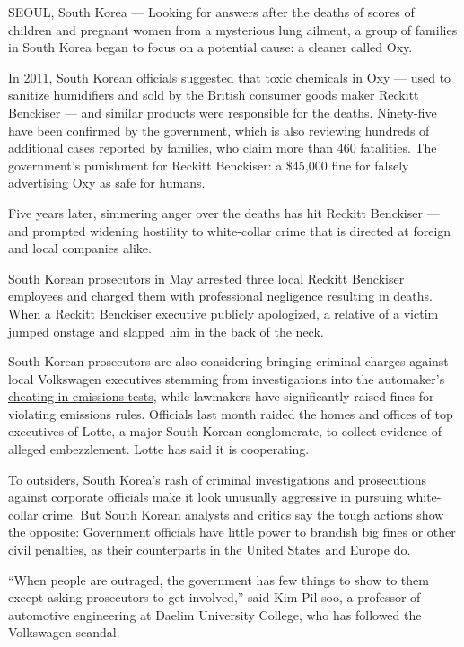 SEOUL, South Korea --- Looking for answers after the deaths of scores of
children and pregnant women from a mysterious lung ailment, a group of
families in South Korea began to focus on a potential cause: a cleaner
called Oxy.

In 2011, South Korean officials suggested that toxic chemicals in Oxy
--- used to sanitize humidifiers and sold by the British consumer goods
maker Reckitt Benckiser --- and similar products were responsible for
the deaths. Ninety-five have been confirmed by the government, which is
also reviewing hundreds of additional cases reported by families, who
claim more than 460 fatalities. The government's punishment for Reckitt
Benckiser: a \$45,000 fine for falsely advertising Oxy as safe for
humans.

Five years later, simmering anger over the deaths has hit Reckitt
Benckiser --- and prompted widening hostility to white-collar crime that
is directed at foreign and local companies alike.

South Korean prosecutors in May arrested three local Reckitt Benckiser
employees and charged them with professional negligence resulting in
deaths. When a Reckitt Benckiser executive publicly apologized, a
relative of a victim jumped onstage and slapped him in the back of the
neck.

South Korean prosecutors are also considering bringing criminal charges
against local Volkswagen executives stemming from investigations into
the automaker's
\href{https://www.nytimes3xbfgragh.onion/interactive/2015/business/international/vw-diesel-emissions-scandal-explained.html}{cheating
in emissions tests}, while lawmakers have significantly raised fines for
violating emissions rules. Officials last month raided the homes and
offices of top executives of Lotte, a major South Korean conglomerate,
to collect evidence of alleged embezzlement. Lotte has said it is
cooperating.

To outsiders, South Korea's rash of criminal investigations and
prosecutions against corporate officials make it look unusually
aggressive in pursuing white-collar crime. But South Korean analysts and
critics say the tough actions show the opposite: Government officials
have little power to brandish big fines or other civil penalties, as
their counterparts in the United States and Europe do.

``When people are outraged, the government has few things to show to
them except asking prosecutors to get involved,'' said Kim Pil-soo, a
professor of automotive engineering at Daelim University College, who
has followed the Volkswagen scandal.

